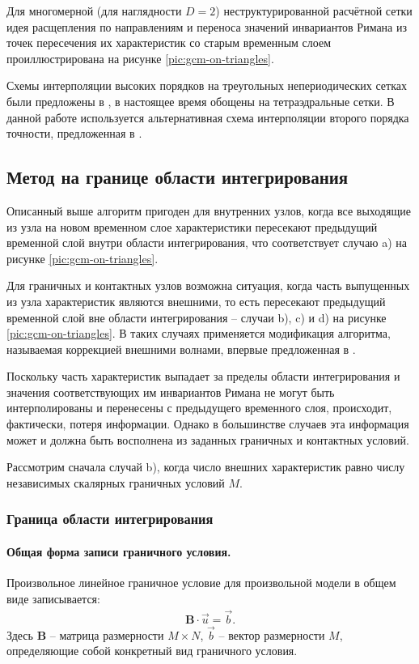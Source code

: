 \documentclass[a4paper]{article}
\numberwithin{equation}{section}
\begin{document}
Для многомерной (для наглядности $D = 2$) неструктурированной расчётной сетки 
идея расщепления по направлениям и переноса значений инвариантов Римана 
из точек пересечения их характеристик со старым временным слоем 
проиллюстрирована на рисунке \ref{pic:gcm-on-triangles}. 

Схемы интерполяции высоких порядков на треугольных непериодических сетках 
были предложены в \cite{chelnokov_agapov}, 
в настоящее время обощены на тетраэдральные сетки. В данной работе 
используется альтернативная схема интерполяции второго порядка точности, 
предложенная в \cite{cgal_interpolation}.


\subsection{Метод на границе области интегрирования}
Описанный выше алгоритм пригоден для внутренних узлов, когда все выходящие 
из узла на новом временном слое характеристики пересекают предыдущий временной слой 
внутри области интегрирования, что соответствует случаю a) на рисунке \ref{pic:gcm-on-triangles}.

Для граничных и контактных узлов возможна ситуация, 
когда часть выпущенных из узла характеристик являются внешними, то есть
пересекают предыдущий временной слой вне области интегрирования -- 
случаи b), c) и d) на рисунке \ref{pic:gcm-on-triangles}. 
В таких случаях применяется модификация алгоритма, 
называемая коррекцией внешними волнами, впервые предложенная в \cite{chelnokov}. 

Поскольку часть характеристик выпадает за пределы области интегрирования 
и значения соответствующих им инвариантов Римана не могут быть интерполированы
и перенесены с предыдущего временного слоя, происходит, фактически, потеря информации. 
Однако в большинстве случаев эта информация может и должна быть восполнена
из заданных граничных и контактных условий.

Рассмотрим сначала случай b), когда число внешних характеристик 
равно числу независимых скалярных граничных условий $M$.


\subsubsection{Граница области интегрирования}
\paragraph{Общая форма записи граничного условия.}
Произвольное линейное граничное условие для произвольной модели 
в общем виде записывается:
\begin{eqnarray}
\label{boundary_condition}
	\mathbf{B} \cdot \vec{u} = \vec{b}.
\end{eqnarray}
Здесь $\mathbf{B}$ -- матрица размерности $M \times N$, $\vec{b}$ -- вектор размерности $M$, 
определяющие собой конкретный вид граничного условия.
\end{document}
